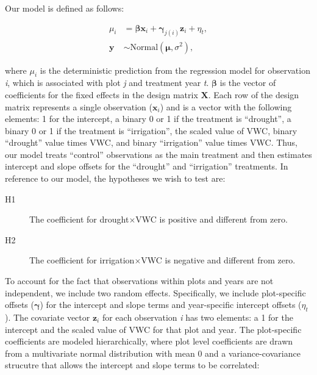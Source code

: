 \documentclass[fleqn,10pt,lineno]{wlpeerj} %
\begin{document}
Our model is defined as follows:

\vspace{-2em}

\begin{align}
\mu_{i} &= \boldsymbol{\beta}\textbf{x}_i + \boldsymbol{\gamma}_{j(i)}\textbf{z}_i + \eta_t, \\
\textbf{y} &\sim \text{Normal} \left(\boldsymbol{\mu}, \sigma^2 \right),
\end{align}

\noindent{}where \(\mu_{i}\) is the deterministic prediction from the
regression model for observation \emph{i}, which is associated with plot
\emph{j} and treatment year \emph{t}. \(\boldsymbol{\beta}\) is the
vector of coefficients for the fixed effects in the design matrix
\(\textbf{X}\). Each row of the design matrix represents a single
observation (\(\textbf{x}_i\)) and is a vector with the following
elements: 1 for the intercept, a binary 0 or 1 if the treatment is
``drought'', a binary 0 or 1 if the treatment is ``irrigation'', the
scaled value of VWC, binary ``drought'' value times VWC, and binary
``irrigation'' value times VWC. Thus, our model treats ``control''
observations as the main treatment and then estimates intercept and
slope offsets for the ``drought'' and ``irrigation'' treatments. In
reference to our model, the hypotheses we wish to test are:

\begin{description}
\item [H1] The coefficient for drought$\times$VWC is positive and different from zero.
\item [H2] The coefficient for irrigation$\times$VWC is negative and different from zero.
\end{description}

To account for the fact that observations within plots and years are not
independent, we include two random effects. Specifically, we include
plot-specific offsets (\(\boldsymbol{\gamma}\)) for the intercept and
slope terms and year-specific intercept offsets (\(\eta_t\)). The
covariate vector \(\textbf{z}_i\) for each observation \emph{i} has two
elements: a 1 for the intercept and the scaled value of VWC for that
plot and year. The plot-specific coefficients are modeled
hierarchically, where plot level coefficients are drawn from a
multivariate normal distribution with mean 0 and a variance-covariance
strucutre that allows the intercept and slope terms to be correlated:

\vspace{-1em}
\end{document}
